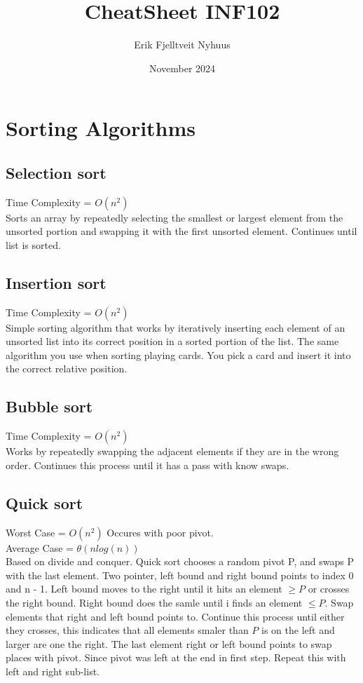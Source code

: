 \documentclass{article}
\title{CheatSheet INF102}
\author{Erik Fjelltveit Nyhuus}
\date{November 2024}
\begin{document}
\maketitle

\tableofcontents

\newpage


\section{Sorting Algorithms}
\subsection{Selection sort}
Time Complexity = $O(n^2)$\\
Sorts an array by repeatedly selecting the smallest or largest element from the unsorted portion
and swapping it with the first unsorted element. Continues until list is sorted.
\subsection{Insertion sort}
Time Complexity = $O(n^2)$\\
Simple sorting algorithm that works by iteratively inserting each element of an unsorted list into its correct 
position in a sorted portion of the list. The same algorithm you use when sorting playing cards. 
You pick a card and insert it into the correct relative position. 
\subsection{Bubble sort}
Time Complexity = $O(n^2)$\\
Works by repeatedly swapping the adjacent elements if they are in the wrong order. Continues 
this process until it has a pass with know swaps.
\subsection{Quick sort}
Worst Case = $O(n^2)$ Occures with poor pivot.\\ 
Average Case = $\theta(nlog(n))$\\
Based on divide and conquer. Quick sort chooses a random pivot P, and swaps P with the last element. Two pointer, left bound and right bound points to index 0 and n - 1.
Left bound moves to the right until it hits an element $\geq P$ or crosses the right bound. Right bound does the samle until i finds an element $\leq P$. 
Swap elements that right and left bound points to. Continue this process until either they crosses, this indicates that all elements smaler than $P$ is on the left and larger are one the right.
The last element right or left bound points to swap places with pivot. Since pivot was left at the end in first step. 
Repeat this with left and right sub-list.  
\end{document}
